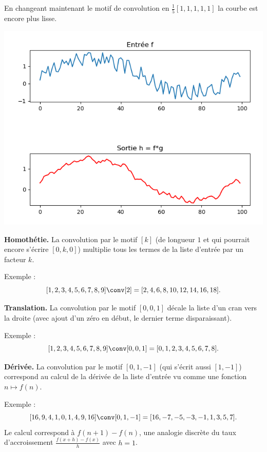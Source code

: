 \documentclass[11pt,class=report,crop=false]{standalone}
\begin{document}
En changeant maintenant le motif de convolution en $\frac15[1,1,1,1,1]$ la courbe est encore plus lisse.

\begin{center}
\includegraphics[scale=\myscale,scale=0.6]{figures/convolution-1d-3}
\end{center}

\textbf{Homothétie.}
La convolution par le motif $[k]$ (de longueur $1$ et qui pourrait encore s'écrire $[0,k,0]$) multiplie tous les termes de la liste d'entrée par un facteur $k$.

Exemple :
$$[1,2,3,4,5,6,7,8,9] \conv [2] = [2,4,6,8,10,12,14,16,18].$$


\textbf{Translation.}
La convolution par le motif $[0,0,1]$ décale la liste d'un cran vers la droite (avec ajout d'un zéro en début, le dernier terme disparaissant).

Exemple :
$$[1,2,3,4,5,6,7,8,9] \conv [0,0,1] = [0,1,2,3,4,5,6,7,8].$$


\textbf{Dérivée.}
La convolution par le motif $[0,1,-1]$ (qui s'écrit aussi $[1,-1]$) correspond au calcul de la dérivée de la liste d'entrée vu comme une fonction $n \mapsto f(n)$.

Exemple :
$$[16,9,4,1,0,1,4,9,16]\conv[0,1,-1] = [16, -7, -5, -3, -1,  1,  3,  5,  7].$$
Le calcul correspond à $f(n+1)-f(n)$, une analogie discrète du taux d'accroissement $\frac{f(x+h)-f(x)}{h}$ avec $h=1$.
\end{document}
